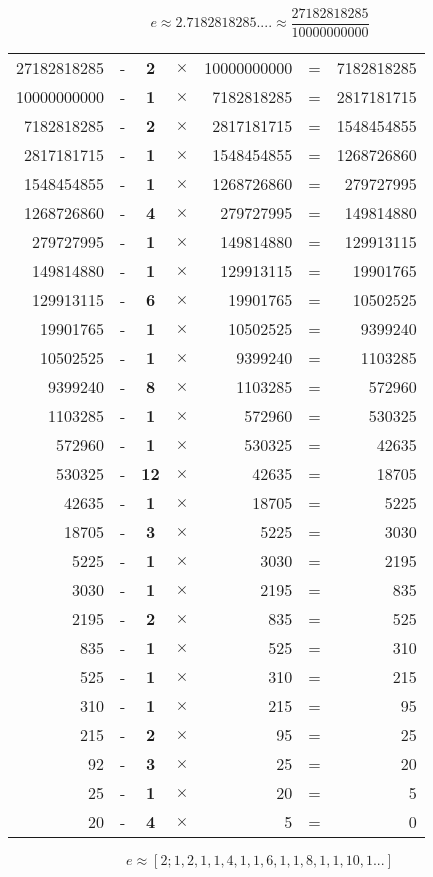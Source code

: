 \documentclass{jreport}
\begin{document}
\[e \approx 2.7182818285.... \approx \frac{27182818285}{10000000000}\]
\begin{table}[htbp]
\begin{center}
\begin{tabular}{|rc|c|crcr|}
\hline
27182818285 & - & \textbf{2} & $\times$ & 10000000000 & = & 7182818285\\
10000000000 & - & \textbf{1} & $\times$ & 7182818285 & = & 2817181715\\
7182818285 & - & \textbf{2} & $\times$ & 2817181715 & = & 1548454855\\
2817181715 & - & \textbf{1} & $\times$ & 1548454855 & = & 1268726860\\
1548454855 & - & \textbf{1} & $\times$ & 1268726860 & = & 279727995\\
1268726860 & - & \textbf{4} & $\times$ & 279727995 & = & 149814880\\
279727995 & - & \textbf{1} & $\times$ & 149814880 & = & 129913115\\
149814880 & - & \textbf{1} & $\times$ & 129913115 & = & 19901765\\
129913115 & - & \textbf{6} & $\times$ & 19901765 & = & 10502525\\
19901765 & - & \textbf{1} & $\times$ & 10502525 & = & 9399240\\
10502525 & - & \textbf{1} & $\times$ & 9399240 & = & 1103285\\
9399240 & - & \textbf{8} & $\times$ & 1103285 & = & 572960\\
1103285 & - & \textbf{1} & $\times$ & 572960 & = & 530325\\
572960 & - & \textbf{1} & $\times$ & 530325 & = & 42635\\
\hline
530325 & - & \textbf{12} & $\times$ & 42635 & = & 18705\\
42635 & - & \textbf{1} & $\times$ & 18705 & = & 5225\\
18705 & - & \textbf{3} & $\times$ & 5225 & = & 3030\\
5225 & - & \textbf{1} & $\times$ & 3030 & = & 2195\\
3030 & - & \textbf{1} & $\times$ & 2195 & = & 835\\
2195 & - & \textbf{2} & $\times$ & 835 & = & 525\\
835 & - & \textbf{1} & $\times$ & 525 & = & 310\\
525 & - & \textbf{1} & $\times$ & 310 & = & 215\\
310 & - & \textbf{1} & $\times$ & 215 & = & 95\\
215 & - & \textbf{2} & $\times$ & 95 & = & 25\\
92 & - & \textbf{3} & $\times$ & 25 & = & 20\\
25 & - & \textbf{1} & $\times$ & 20 & = & 5\\
20 & - & \textbf{4} & $\times$ & 5 & = & 0\\
\hline
\end{tabular}
\end{center}
\end{table}
\[e\approx [2;1,2,1,1,4,1,1,6,1,1,8,1,1,10,1...]\]
\end{document}
